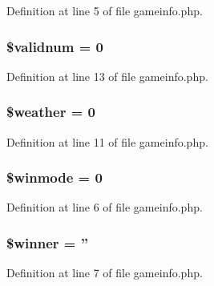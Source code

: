 Definition at line 5 of file gameinfo.\+php.

\hypertarget{gamedata_2gameinfo_8php_a54f1a166645794ce06e05051071a0d53}{
\subsubsection[{\$validnum}]{\setlength{\rightskip}{0pt plus 5cm}\$validnum = 0}}\label{gamedata_2gameinfo_8php_a54f1a166645794ce06e05051071a0d53}


Definition at line 13 of file gameinfo.\+php.

\hypertarget{gamedata_2gameinfo_8php_a7c88c8dfcf14e98d581073a25966ec09}{
\subsubsection[{\$weather}]{\setlength{\rightskip}{0pt plus 5cm}\$weather = 0}}\label{gamedata_2gameinfo_8php_a7c88c8dfcf14e98d581073a25966ec09}


Definition at line 11 of file gameinfo.\+php.

\hypertarget{gamedata_2gameinfo_8php_afe89a6c5b88f243cfb7699a60ed3e0f3}{
\subsubsection[{\$winmode}]{\setlength{\rightskip}{0pt plus 5cm}\$winmode = 0}}\label{gamedata_2gameinfo_8php_afe89a6c5b88f243cfb7699a60ed3e0f3}


Definition at line 6 of file gameinfo.\+php.

\hypertarget{gamedata_2gameinfo_8php_ad92744668d7f5e7b2ee5b87fe8a845f2}{
\subsubsection[{\$winner}]{\setlength{\rightskip}{0pt plus 5cm}\$winner = ''}}\label{gamedata_2gameinfo_8php_ad92744668d7f5e7b2ee5b87fe8a845f2}


Definition at line 7 of file gameinfo.\+php.

